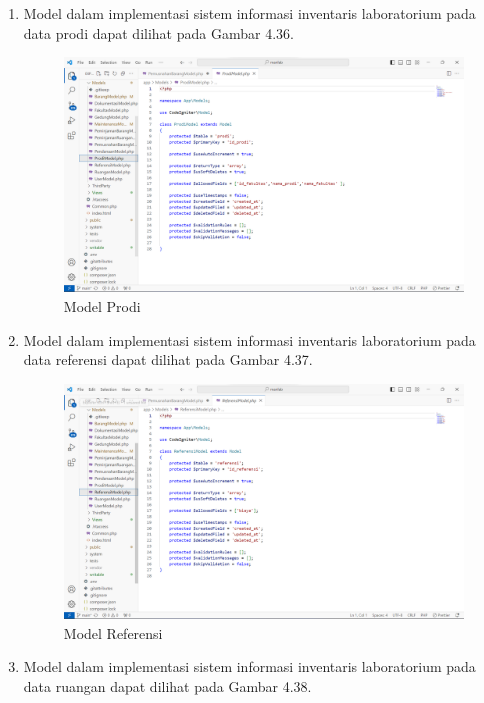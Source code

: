 \begin{enumerate}
  \item Model dalam implementasi sistem informasi inventaris laboratorium pada data prodi dapat dilihat pada Gambar 4.36.

        \begin{figure}
          \centering
          \includegraphics[width=0.82\linewidth]{konten//gambar/prodi model.png}
          \caption{Model Prodi}
          \label{fig:enter-label}
        \end{figure}

  \item Model dalam implementasi sistem informasi inventaris laboratorium pada data referensi dapat dilihat pada Gambar 4.37.

        \begin{figure}
          \centering
          \includegraphics[width=0.82\linewidth]{konten//gambar/referensi model.png}
          \caption{Model Referensi}
          \label{fig:enter-label}
        \end{figure}

  \item Model dalam implementasi sistem informasi inventaris laboratorium pada data ruangan dapat dilihat pada Gambar 4.38.


\end{enumerate}
